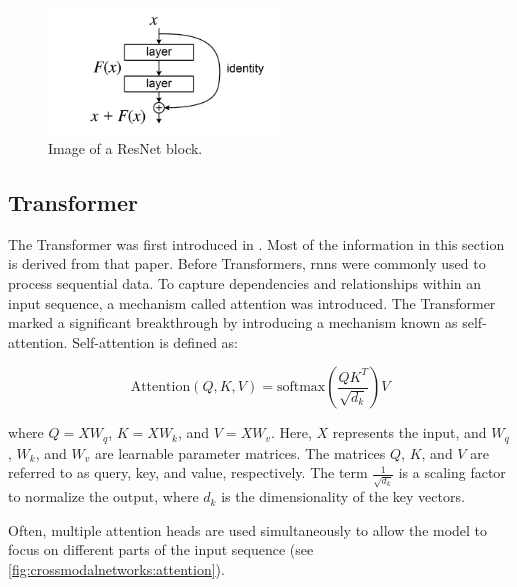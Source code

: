     \begin{figure}[h]
        \centering
        \includegraphics[width=0.55\textwidth]{Images/crossmodalnetworks/ResBlock.png}
        \caption{Image of a ResNet block.\cite{resnetpaper}}
        \label{fig:crossmodalnetworks:resblock}
    \end{figure}

    \subsection{Transformer}

    The Transformer was first introduced in \cite{attentionisallyouneed}.
    Most of the information in this section is derived from that paper. 
    Before Transformers, \acrfull{rnn}s were commonly used to process sequential data. 
    To capture dependencies and relationships within an input sequence, a mechanism called attention was introduced. 
    The Transformer marked a significant breakthrough by introducing a mechanism known as self-attention. 
    Self-attention is defined as:

    \begin{equation}
        \text{Attention}(Q, K, V) = \text{softmax}\left(\frac{QK^T}{\sqrt{d_k}}\right)V
        \label{equ:selfattention}
    \end{equation}

    where \(Q = XW_q\), \(K = XW_k\), and \(V = XW_v\). 
    Here, \(X\) represents the input, and \(W_{q}\), \(W_{k}\), and \(W_{v}\) are learnable parameter matrices. 
    The matrices \(Q\), \(K\), and \(V\) are referred to as query, key, and value, respectively. 
    The term \(\frac{1}{\sqrt{d_k}}\) is a scaling factor to normalize the output, where \(d_k\) is the dimensionality of the key vectors.
    
    Often, multiple attention heads are used simultaneously to allow the model to focus on different parts of the input sequence (see \cref{fig:crossmodalnetworks:attention}).
    
